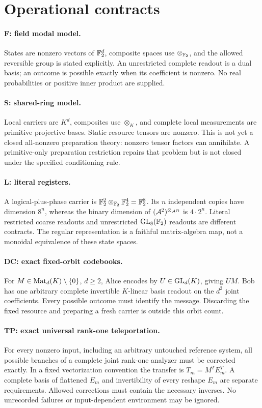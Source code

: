 \section{Operational contracts}
\label{sec:contracts}
\paragraph{F: field modal model.}
States are nonzero vectors of $\mathbb F_2^d$, composite spaces use $\otimes_{\mathbb F_2}$,
and the allowed reversible group is stated explicitly. An unrestricted complete
readout is a dual basis; an outcome is possible exactly when its coefficient is
nonzero. No real probabilities or positive inner product are supplied.

\paragraph{S: shared-ring model.}
Local carriers are $K^d$, composites use $\otimes_K$, and complete local
measurements are primitive projective bases. Static resource tensors are
nonzero. This is not yet a closed all-nonzero preparation theory: nonzero tensor
factors can annihilate. A primitive-only preparation restriction repairs that
problem but is not closed under the specified conditioning rule.

\paragraph{L: literal registers.}
A logical-plus-phase carrier is $\mathbb F_2^2\otimes_{\mathbb F_2}\mathbb F_2^4=\mathbb F_2^8$.
Its $n$ independent copies have dimension $8^n$, whereas the binary dimension of
$(\mathcal A^2)^{\otimes_\mathcal A n}$ is $4\cdot2^n$. Literal restricted coarse readouts and
unrestricted $\operatorname{GL}_8(\mathbb F_2)$ readouts are different contracts. The regular
representation is a faithful matrix-algebra map, not a monoidal equivalence of
these state spaces.

\paragraph{DC: exact fixed-orbit codebooks.}
For $M\in\operatorname{Mat}_d(K)\setminus\{0\}$, $d\geq2$, Alice encodes by
$U\in\operatorname{GL}_d(K)$, giving $UM$. Bob has one arbitrary complete invertible
$K$-linear basis readout on the $d^2$ joint coefficients. Every possible outcome
must identify the message. Discarding the fixed resource and preparing a fresh
carrier is outside this orbit count.

\paragraph{TP: exact universal rank-one teleportation.}
For every nonzero input, including an arbitrary untouched reference system,
all possible branches of a complete joint rank-one analyzer must be corrected
exactly. In a fixed vectorization convention the transfer is $T_m=M^T E_m^T$.
A complete basis of flattened $E_m$ and invertibility of every reshape $E_m$
are separate requirements. Allowed corrections must contain the necessary
inverses. No unrecorded failures or input-dependent environment may be ignored.

